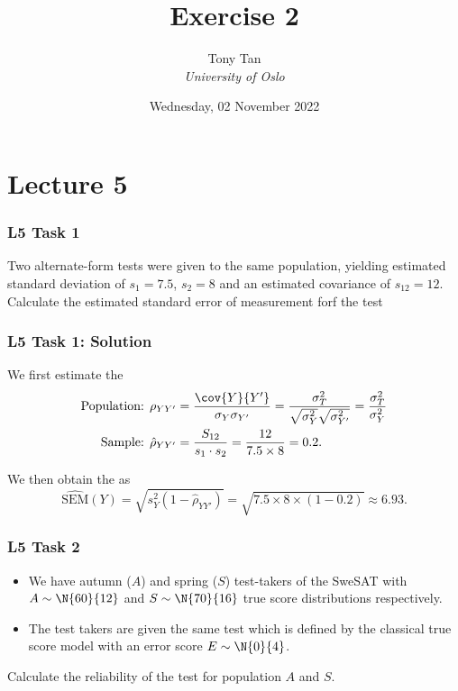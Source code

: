 \documentclass[compress]{beamer}\usepackage[]{graphicx}\usepackage[]{xcolor}
\title{Exercise 2}
\author[]{Tony Tan \\\vspace{6pt} {\em{University of Oslo}} }
\date{Wednesday, 02 November 2022}
\begin{document}
\begin{frame}[fragile]
\titlepage
\end{frame}


\section{Lecture 5}

\begin{frame}[fragile]
  \frametitle{L5 Task 1}
    Two alternate-form tests were given to the same population, yielding estimated standard deviation of $s_1 = 7.5$, $s_2 = 8$ and an estimated covariance of $s_{12} = 12$. Calculate the estimated standard error of measurement forf the test
\end{frame}


\begin{frame}[fragile]
  \frametitle{L5 Task 1: Solution}
    We first estimate the 
    \begin{equation*}
      \begin{aligned}
        \text{Population: } \rho_{YY'} &= \frac{\cov{Y}{Y'}}{\sigma_Y \sigma_{Y'}} = \frac{\sigma_T^2}{\sqrt{\sigma_Y^2} \sqrt{\sigma_{Y'}^2}} = \frac{\sigma_T^2}{\sigma_Y^2} \\
        \text{Sample: } \hat{\rho}_{YY'} &= \frac{S_{12}}{s_1 \cdot s_2} = \frac{12}{7.5 \times 8} = 0.2.
      \end{aligned}
    \end{equation*}

    We then obtain the  as
      \[ \hat{\text{SEM}} (Y) = \sqrt{s_Y^2 (1 - \hat{\rho}_{YY'})} = \sqrt{7.5 \times 8 \times (1 - 0.2)} \approx 6.93. \]
\end{frame}


\begin{frame}[fragile]
  \frametitle{L5 Task 2}
    \begin{itemize}
      \item We have autumn ($A$) and spring ($S$) test-takers of the SweSAT with $A \sim \N{60}{12}$ and $S \sim \N{70}{16}$ true score distributions respectively.
      \item The test takers are given the same test which is defined by the classical true score model with an error score $E \sim \N{0}{4}$.
    \end{itemize}

    Calculate the reliability of the test for population $A$ and $S$.
\end{frame}
\end{document}
